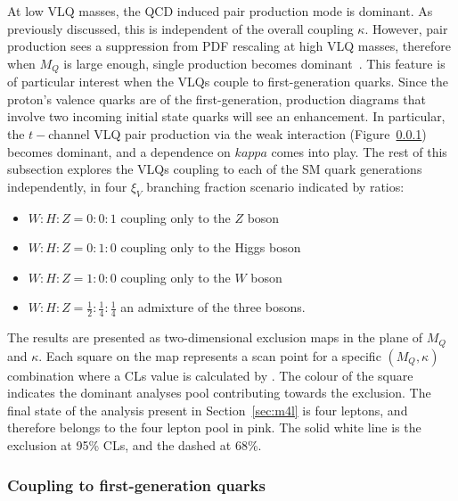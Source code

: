 At low VLQ masses, the QCD induced pair production mode is dominant. As previously discussed, this is independent of the overall coupling $\kappa$. However, pair production sees a suppression from PDF rescaling at high VLQ masses, therefore when $M_Q$ is large enough, single production becomes dominant~\cite{Panizzi:2014dwa}. This feature is of particular interest when the VLQs couple to first-generation quarks. Since the proton's valence quarks are of the first-generation, production diagrams that involve two incoming initial state quarks will see an enhancement. In particular, the $t-$channel VLQ pair production via the weak interaction (Figure~\ref{}) becomes dominant, and a dependence on $kappa$ comes into play. 
The rest of this subsection explores the VLQs coupling to each of the SM quark generations independently, in four $\xi_V$ branching fraction scenario indicated by ratios: 
\begin{itemize}
	\item{$W:H:Z=0:0:1$ coupling only to the $Z$ boson}
	\item{$W:H:Z=0:1:0$ coupling only to the Higgs boson}
	\item{$W:H:Z=1:0:0$ coupling only to the $W$ boson}
	\item{$W:H:Z=\frac{1}{2}:\frac{1}{4}:\frac{1}{4}$ an admixture of the three bosons}.
\end{itemize}
The results are presented as two-dimensional exclusion maps in the plane of $M_Q$ and $\kappa$. Each square on the map represents a scan point for a specific $(M_Q,\kappa)$ combination where a CLs value is calculated by \contur. The colour of the square indicates the dominant analyses pool contributing towards the exclusion. The final state of the \ATLAS analysis present in Section~\ref{sec:m4l} is four leptons, and therefore belongs to the four lepton pool in pink. The solid white line is the exclusion at 95\% CLs, and the dashed at 68\%. 

\subsubsection{Coupling to first-generation quarks}

